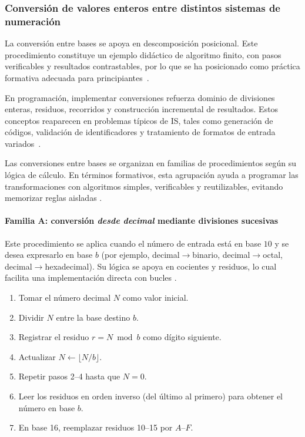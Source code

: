 \documentclass[12pt,twoside]{book}
\begin{document}
					\subsubsection{Conversión de valores enteros entre distintos sistemas de numeración}
						\noindent
						La conversión entre bases se apoya en descomposición posicional. Este procedimiento constituye un ejemplo didáctico de algoritmo finito, con pasos verificables y resultados contrastables, por lo que se ha posicionado como práctica formativa adecuada para principiantes~\cite{Wirth1976Algorithms,Hanly2015Problem,Gaddis2022Starting}.
						
						En programación, implementar conversiones refuerza dominio de divisiones enteras, residuos, recorridos y construcción incremental de resultados. Estos conceptos reaparecen en problemas típicos de IS, tales como generación de códigos, validación de identificadores y tratamiento de formatos de entrada variados~\cite{Manzano2017Programacion,Gaddis2022Starting,Hanly2015Problem}.
						
						Las conversiones entre bases se organizan en familias de procedimientos según su lógica de cálculo. En términos formativos, esta agrupación ayuda a programar las transformaciones con algoritmos simples, verificables y reutilizables, evitando memorizar reglas aisladas \cite{Wirth1976Algorithms,Hanly2015Problem,Gaddis2022Starting}.
						
						\paragraph{Familia A: conversión \emph{desde decimal} mediante divisiones sucesivas}
						Este procedimiento se aplica cuando el número de entrada está en base $10$ y se desea expresarlo en base $b$ (por ejemplo, decimal$\rightarrow$binario, decimal$\rightarrow$octal, decimal$\rightarrow$hexadecimal). Su lógica se apoya en cocientes y residuos, lo cual facilita una implementación directa con bucles \cite{Hanly2015Problem,Gaddis2022Starting,Wirth1976Algorithms}.
						
						\begin{enumerate}
							\item Tomar el número decimal $N$ como valor inicial.
							\item Dividir $N$ entre la base destino $b$.
							\item Registrar el residuo $r = N \bmod b$ como dígito siguiente.
							\item Actualizar $N \leftarrow \lfloor N/b \rfloor$.
							\item Repetir pasos 2--4 hasta que $N=0$.
							\item Leer los residuos en orden inverso (del último al primero) para obtener el número en base $b$.
							\item En base 16, reemplazar residuos 10--15 por $A$--$F$.
						\end{enumerate}
						
\end{document}
